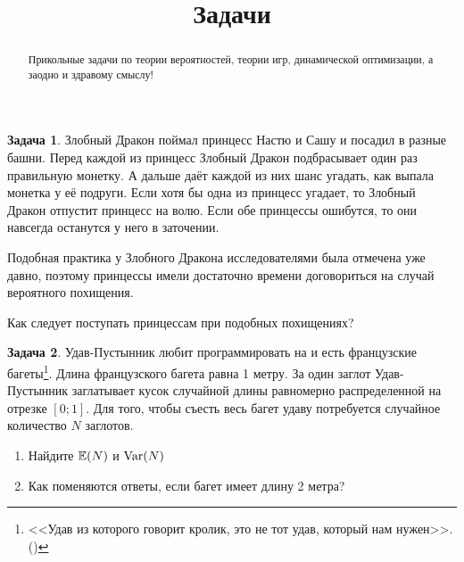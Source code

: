 \documentclass[final,pdftex]{../../template/epsilonj}
\theoremstyle{definition} %
\newtheorem{zadacha}{Задача}
\begin{document}
\setcounter{page}{57}

\begin{frontmatter}
\title{Задачи}

\begin{aug}
\author{ } %


\end{aug}

\begin{abstract}
Прикольные задачи по теории вероятностей, теории игр, динамической оптимизации, а заодно и здравому смыслу!
\end{abstract}

\begin{keyword}
\end{keyword}

\end{frontmatter}




\begin{zadacha}
Злобный Дракон поймал принцесс Настю и Сашу и посадил в разные башни. Перед каждой из принцесс Злобный Дракон подбрасывает один раз правильную монетку. А дальше даёт каждой из них шанс угадать, как выпала монетка у её подруги. Если хотя бы одна из принцесс угадает, то Злобный Дракон отпустит принцесс на волю. Если обе принцессы ошибутся, то они навсегда останутся у него в заточении.

Подобная практика у Злобного Дракона исследователями была отмечена уже давно, поэтому принцессы имели достаточно времени договориться на случай вероятного похищения.

Как следует поступать принцессам при подобных похищениях?
\end{zadacha}

\begin{zadacha}
Удав-Пустынник любит программировать на  и есть французские багеты\footnote{<<Удав из которого говорит кролик, это не тот удав, который нам нужен>>. (\cite{iskander:kroliki})}. Длина французского багета равна 1 метру. За один заглот Удав-Пустынник заглатывает кусок случайной длины равномерно распределенной на отрезке $[0;1]$. Для того, чтобы съесть весь багет удаву потребуется случайное количество $N$ заглотов. 
\begin{enumerate}
\item Найдите $\mathbb{E}(N)$ и $\operatorname{Var}(N)$
\item Как поменяются ответы, если багет имеет длину 2 метра?
\end{enumerate}
\end{zadacha}
\end{document}
